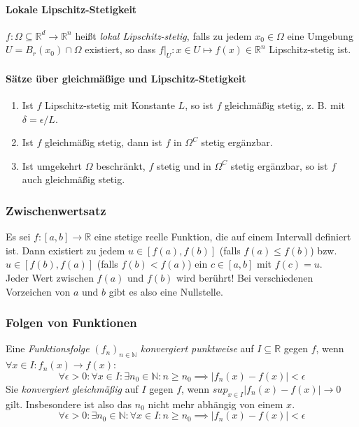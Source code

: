 \documentclass[a4paper, 9pt, DIV=24]{scrartcl}
\newcommand{\N}{\mathbb{N}}
\newcommand{\R}{\mathbb{R}}
\begin{document}
\paragraph{Lokale Lipschitz-Stetigkeit}
$f: \Omega \subseteq \R^d \rightarrow \R^n$ heißt \emph{lokal Lipschitz-stetig},
falls zu jedem $x_0\in\Omega$ eine Umgebung $U = B_r(x_0)\cap\Omega$ existiert,
so dass $f|_U : x \in U \mapsto f(x) \in \R^n$ Lipschitz-stetig ist.


\paragraph{Sätze über gleichmäßige und Lipschitz-Stetigkeit}
\begin{enumerate}[label={(}\arabic*{)}]
 \item Ist $f$ Lipschitz-stetig mit Konstante $L$, so ist $f$ gleichmäßig stetig, z. B. mit $\delta = \epsilon/L$.
 \item Ist $f$ gleichmäßig stetig, dann ist $f$ in $\Omega^C$ stetig ergänzbar.
 \item Ist umgekehrt $\Omega$ beschränkt, $f$ stetig und in $\Omega^C$ stetig ergänzbar, so ist $f$ auch gleichmäßig stetig.
\end{enumerate}

\subsubsection{Zwischenwertsatz}
Es sei $f: [a,b] \to \R$ eine stetige reelle Funktion, die auf einem Intervall definiert ist.
Dann existiert zu jedem $u\in [f(a), f(b)]$ (falls $f(a)\leq f(b)$) bzw. $u\in [f(b), f(a)]$ (falls $f(b)< f(a)$) ein $c\in [a,b]$ mit $f\left(c\right)=u$. \\
     Jeder Wert zwischen $f(a)$ und $f(b)$ wird berührt! Bei verschiedenen Vorzeichen von $a$ und $b$ gibt es also eine Nullstelle.

\subsubsection{Folgen von Funktionen}
Eine \emph{Funktionsfolge} $(f_n)_{n\in\N}$ \emph{konvergiert punktweise} auf $I \subseteq \R$ gegen $f$, wenn $\forall x\in I: f_n(x) \rightarrow f(x)$:
\[ \forall \epsilon > 0: \forall x \in I: \exists n_0 \in \N: n \geq n_0 \implies |f_n(x)-f(x)| < \epsilon \]
Sie \emph{konvergiert gleichmäßig} auf $I$ gegen $f$, wenn $sup_{x\in I} |f_n(x) - f(x)| \rightarrow 0$ gilt.
Insbesondere ist also das $n_0$ nicht mehr abhängig von einem $x$.
\[ \forall \epsilon > 0: \exists n_0 \in \N: \forall x \in I: n \geq n_0 \implies |f_n(x)-f(x)| < \epsilon \]
\end{document}
